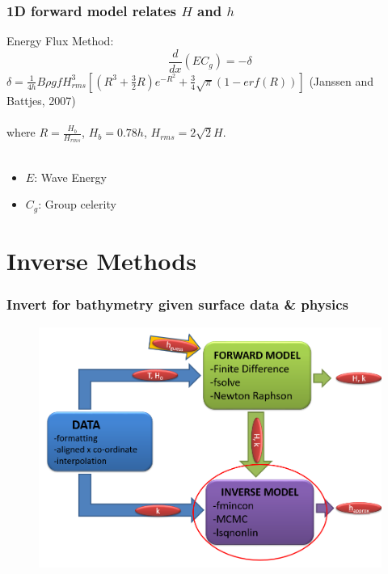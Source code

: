\documentclass[7pt]{beamer}
\begin{document}
\begin{frame}
	\frametitle{1D forward model relates $H$ and $h$}
	Energy Flux Method:
	$$\frac{d}{dx}\left(EC_g\right)=-\delta $$
	\centering
		 $\delta = \frac{1}{4h}B\rho g f H^3_{rms}\left[(R^3+\frac{3}{2}R)e^{-R^2}+\frac{3}{4}\sqrt{\pi}(1-erf(R))\right]$
		 (Janssen and Battjes, 2007) \\
	$\,$\\
	where $R=\frac{H_b}{H_{rms}}$, $H_b=0.78h$, $H_{rms}=2\sqrt{2}H$. \\
	$\,$\\
	\begin{itemize}
		\item $E$: Wave Energy
		\item  $C_{g}$: Group celerity
	\end{itemize}
\end{frame}

\section{Inverse Methods}

\begin{frame}
 	\frametitle{Invert for bathymetry given surface data \& physics}
		\begin{figure}
			\includegraphics[width=1.0\linewidth]{img/INV.png}
		\end{figure}
\end{frame}
\end{document}
